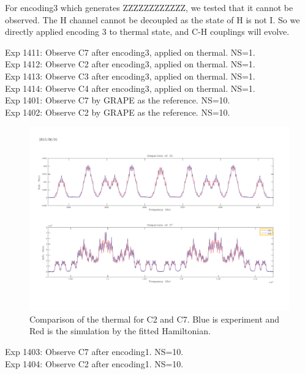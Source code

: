 \documentclass[prl,onecolumn]{revtex4-1}
\begin{document}
For encoding3 which generates ZZZZZZZZZZZZ, we tested that it cannot be observed. The H channel cannot be decoupled as the state of H is not I. So we directly applied encoding 3 to thermal state, and C-H couplings will evolve. 

Exp 1411: Observe C7 after encoding3, applied on thermal. NS=1.\\
Exp 1412: Observe C2 after encoding3, applied on thermal. NS=1.\\
Exp 1413: Observe C3 after encoding3, applied on thermal. NS=1.\\
Exp 1414: Observe C4 after encoding3, applied on thermal. NS=1.\\


\clearpage
Exp 1401: Observe C7 by GRAPE as the reference. NS=10.\\
Exp 1402: Observe C2 by GRAPE as the reference. NS=10. \\

\begin{figure}[htb]
\begin{center}
\includegraphics[width=\columnwidth]{Thermal_C2andC7.pdf}
\end{center}
\setlength{\abovecaptionskip}{-0.35cm}
\caption{\footnotesize{Comparison of the thermal for C2 and C7. Blue is experiment and Red is the simulation by the fitted Hamiltonian.}}\label{1401and1402}
\end{figure}

\clearpage
Exp 1403: Observe C7 after encoding1. NS=10.\\
Exp 1404: Observe C2 after encoding1. NS=10.\\
\end{document}
